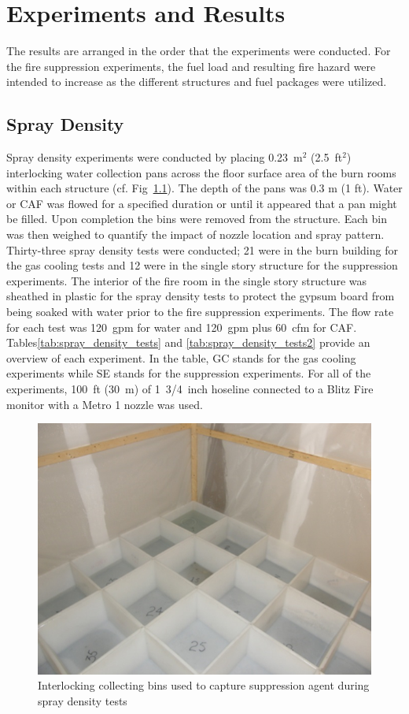 \documentclass[12pt,oneside]{book}
\begin{document}
\chapter{Experiments and Results}
\label{chap:Experiments_and_Results}

The results are arranged in the order that the experiments were conducted.  For the fire suppression experiments, the fuel load and resulting fire hazard were intended to increase as the different structures and fuel packages were utilized.  

\section{Spray Density}
\label{sec:Spray_Density}

Spray density experiments were conducted by placing 0.23~m$^2$ (2.5~ft$^2$) interlocking water collection pans across the floor surface area of the burn rooms within each structure (cf. Fig~\ref{fig:water_buckets}). The depth of the pans was 0.3 m (1 ft).  Water or CAF was flowed for a specified duration or until it appeared that a pan might be filled.  Upon completion the bins were removed from the structure. Each bin was then weighed to quantify the impact of nozzle location and spray pattern. Thirty-three spray density tests were conducted; 21 were in the burn building for the gas cooling tests and 12 were in the single story structure for the suppression experiments. The interior of the fire room in the single story structure was sheathed in plastic for the spray density tests to protect the gypsum board from being soaked with water prior to the fire suppression experiments.  The flow rate for each test was 120~gpm for water and 120~gpm plus 60~cfm for CAF. Tables\ref{tab:spray_density_tests} and \ref{tab:spray_density_tests2} provide an overview of each experiment. In the table, GC stands for the gas cooling experiments while SE stands for the suppression experiments. For all of the experiments, 100~ft (30~m) of 1~3/4~inch hoseline connected to a Blitz Fire monitor with a Metro 1 nozzle was used.

\begin{figure}[!ht]
	\includegraphics[width=.5\columnwidth]{../Figures/Pictures/Water Tests Bins.png}
	\caption{Interlocking collecting bins used to capture suppression agent during spray density tests}
	\label{fig:water_buckets}
\end{figure}
\end{document}
